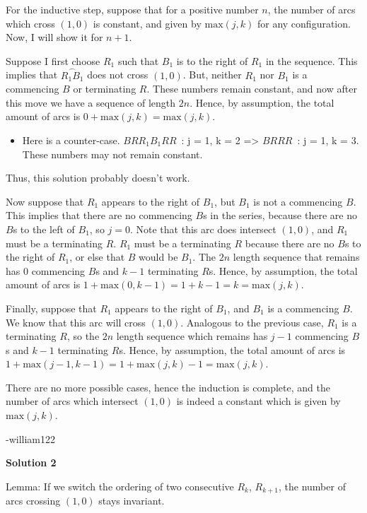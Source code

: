 \begin{enumerate}
 For the inductive step, suppose that for a positive number $n$, the number of arcs which cross $(1,0)$ is constant, and given by $\text{max}(j, k)$ for any configuration. Now, I will show it for $n+1$.

 Suppose I first choose $R_1$ such that $B_1$ is to the right of $R_1$ in the sequence. This implies that $\stackrel{\frown}{R_1B_1}$ does not cross $(1,0)$. But, neither $R_1$ nor $B_1$ is a commencing $B$ or terminating $R$. These numbers remain constant, and now after this move we have a sequence of length $2n$. Hence, by assumption, the total amount of arcs is $0+\text{max}(j,k)=\text{max}(j,k)$.

 
            \begin{itemize}
        \item Here is a counter-case. $BRR_{1}B_{1}RR$ : j = 1, k = 2 => $BRRR$ : j = 1, k = 3. These numbers may not remain constant.
            \end{itemize}
            Thus, this solution probably doesn't work.

 Now suppose that $R_1$ appears to the right of $B_1$, but $B_1$ is not a commencing $B$. This implies that there are no commencing $B$s in the series, because there are no $B$s to the left of $B_1$, so $j=0$. Note that this arc does intersect $(1,0)$, and $R_1$ must be a terminating $R$. $R_1$ must be a terminating $R$ because there are no $B$s to the right of $R_1$, or else that $B$ would be $B_1$. The $2n$ length sequence that remains has $0$ commencing $B$s and $k-1$ terminating $R$s. Hence, by assumption, the total amount of arcs is $1+\text{max}(0,k-1)=1+k-1=k=\text{max}(j,k)$.

 Finally, suppose that $R_1$ appears to the right of $B_1$, and $B_1$ is a commencing $B$. We know that this arc will cross $(1,0)$. Analogous to the previous case, $R_1$ is a terminating $R$, so the $2n$ length sequence which remains has $j-1$ commencing $B$s and $k-1$ terminating $R$s. Hence, by assumption, the total amount of arcs is $1+\text{max}(j-1,k-1)=1+\text{max}(j,k)-1=\text{max}(j,k)$.

 There are no more possible cases, hence the induction is complete, and the number of arcs which intersect $(1,0)$ is indeed a constant which is given by $\text{max}(j,k)$.

 -william122

 



\textbf{Solution 2}

Lemma: If we switch the ordering of two consecutive $R_k$, $R_{k+1}$, the number of arcs crossing $(1,0)$ stays invariant.


\end{enumerate}
